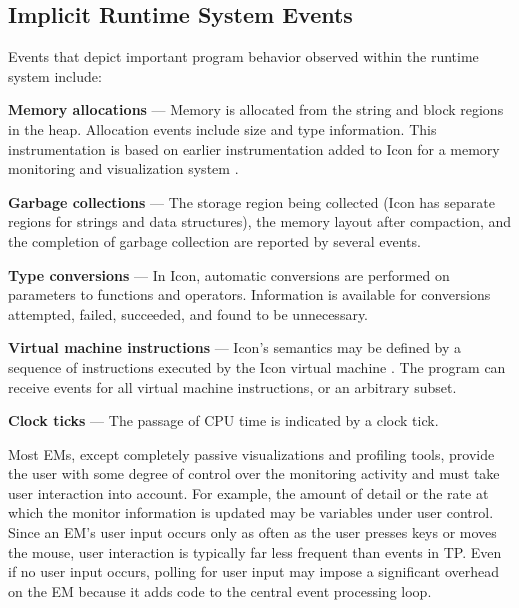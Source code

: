 \subsection*{Implicit Runtime System Events}

Events that depict important program behavior observed within the runtime
system include:

\begin{list}{}{\itemsep 7pt} %
\item [{\bf Memory allocations}] --- Memory is allocated from the
	string and block regions in the heap.  Allocation events
	include size and type information.
	This instrumentation is based on earlier instrumentation added to Icon
	for a memory monitoring and visualization system \cite{Townsend89}.

\item [{\bf Garbage collections}] --- The storage region being
	collected (Icon has separate regions for strings and data
	structures), the memory layout after compaction, and the
	completion of garbage collection are reported by several events.
\item [{\bf Type conversions}] --- In Icon, automatic conversions are
	performed on parameters	to functions and
	operators.  Information is available for conversions
	attempted, failed, succeeded, and found to be unnecessary.
\item [{\bf Virtual machine instructions}] --- Icon's semantics may be
	defined by a sequence of instructions executed by the Icon virtual
	machine \cite{Griswold86}.  The program can receive events for
	all virtual machine instructions, or an arbitrary subset.
\item [{\bf Clock ticks}] --- The  passage of CPU time
	is indicated by a clock tick.
\end{list}


Most EMs, except completely passive visualizations and profiling
tools, provide the user with some degree of control over the
monitoring activity and must take user interaction into account.
For example, the amount of detail or the rate at which the monitor
information is updated may be variables under user control.  Since
an EM's user input occurs only as often as the user presses keys or
moves the mouse, user interaction is typically far less frequent than
events in TP.  Even if no user input occurs, polling for user input
may impose a significant overhead on the EM because it adds code to
the central event processing loop.

